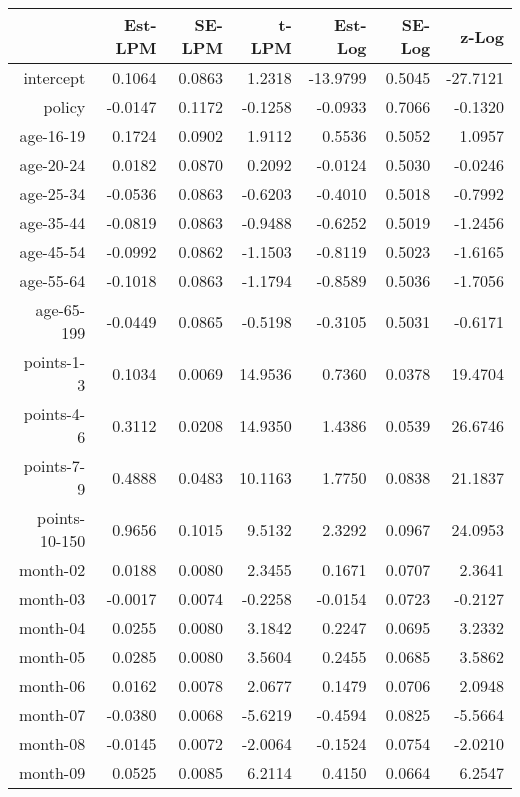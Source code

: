 \documentclass[10pt]{article}
\begin{document}
\begin{table}[ht]
\centering
\begin{tabular}{rrrrrrr}
  \hline
 & Est-LPM & SE-LPM & t-LPM & Est-Log & SE-Log & z-Log \\ 
  \hline
intercept & 0.1064 & 0.0863 & 1.2318 & -13.9799 & 0.5045 & -27.7121 \\ 
  policy & -0.0147 & 0.1172 & -0.1258 & -0.0933 & 0.7066 & -0.1320 \\ 
  age-16-19 & 0.1724 & 0.0902 & 1.9112 & 0.5536 & 0.5052 & 1.0957 \\ 
  age-20-24 & 0.0182 & 0.0870 & 0.2092 & -0.0124 & 0.5030 & -0.0246 \\ 
  age-25-34 & -0.0536 & 0.0863 & -0.6203 & -0.4010 & 0.5018 & -0.7992 \\ 
  age-35-44 & -0.0819 & 0.0863 & -0.9488 & -0.6252 & 0.5019 & -1.2456 \\ 
  age-45-54 & -0.0992 & 0.0862 & -1.1503 & -0.8119 & 0.5023 & -1.6165 \\ 
  age-55-64 & -0.1018 & 0.0863 & -1.1794 & -0.8589 & 0.5036 & -1.7056 \\ 
  age-65-199 & -0.0449 & 0.0865 & -0.5198 & -0.3105 & 0.5031 & -0.6171 \\ 
  points-1-3 & 0.1034 & 0.0069 & 14.9536 & 0.7360 & 0.0378 & 19.4704 \\ 
  points-4-6 & 0.3112 & 0.0208 & 14.9350 & 1.4386 & 0.0539 & 26.6746 \\ 
  points-7-9 & 0.4888 & 0.0483 & 10.1163 & 1.7750 & 0.0838 & 21.1837 \\ 
  points-10-150 & 0.9656 & 0.1015 & 9.5132 & 2.3292 & 0.0967 & 24.0953 \\ 
  month-02 & 0.0188 & 0.0080 & 2.3455 & 0.1671 & 0.0707 & 2.3641 \\ 
  month-03 & -0.0017 & 0.0074 & -0.2258 & -0.0154 & 0.0723 & -0.2127 \\ 
  month-04 & 0.0255 & 0.0080 & 3.1842 & 0.2247 & 0.0695 & 3.2332 \\ 
  month-05 & 0.0285 & 0.0080 & 3.5604 & 0.2455 & 0.0685 & 3.5862 \\ 
  month-06 & 0.0162 & 0.0078 & 2.0677 & 0.1479 & 0.0706 & 2.0948 \\ 
  month-07 & -0.0380 & 0.0068 & -5.6219 & -0.4594 & 0.0825 & -5.5664 \\ 
  month-08 & -0.0145 & 0.0072 & -2.0064 & -0.1524 & 0.0754 & -2.0210 \\ 
  month-09 & 0.0525 & 0.0085 & 6.2114 & 0.4150 & 0.0664 & 6.2547 \\ 

\end{tabular}
\end{table}
\end{document}

